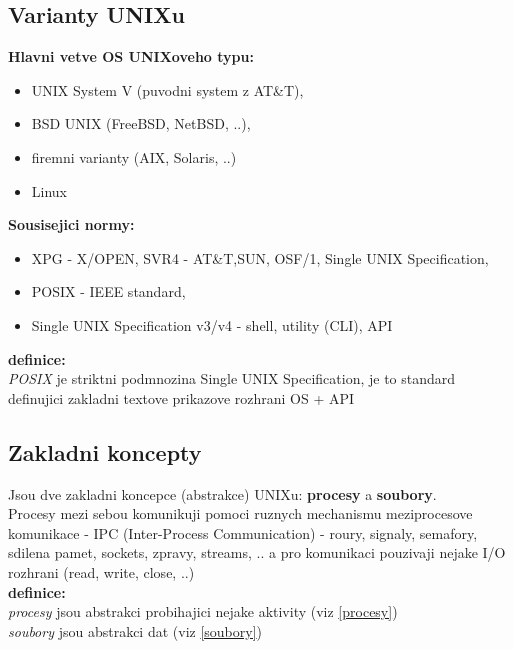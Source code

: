\documentclass[a4paper, 11pt]{article}
\begin{document}
\newpage

\subsection{Varianty UNIXu}
\textbf{Hlavni vetve OS UNIXoveho typu:}
\begin{itemize}
    \item UNIX System V (puvodni system z AT\&T),
    \item BSD UNIX (FreeBSD, NetBSD, ..),
    \item firemni varianty (AIX, Solaris, ..)
    \item Linux \\
\end{itemize}

\noindent\textbf{Sousisejici normy:}
\begin{itemize}
    \item XPG - X/OPEN, SVR4 - AT\&T,SUN, OSF/1, Single UNIX Specification,
    \item POSIX - IEEE standard,
    \item Single UNIX Specification v3/v4 - shell, utility (CLI), API \\
\end{itemize}

\noindent\textbf{definice:} \\[0.5em]
\textit{POSIX} je striktni podmnozina Single UNIX Specification, je to standard definujici zakladni textove prikazove rozhrani OS + API \\[1em]

\subsection{Zakladni koncepty}
Jsou dve zakladni koncepce (abstrakce) UNIXu: \textbf{procesy} a \textbf{soubory}. \\

\noindent Procesy mezi sebou komunikuji pomoci ruznych mechanismu meziprocesove komunikace - IPC (Inter-Process Communication) - roury, signaly, semafory, sdilena pamet, sockets, zpravy, streams, .. a pro komunikaci pouzivaji nejake I/O rozhrani (read, write, close, ..) \\

\noindent\textbf{definice:} \\[0.5em]
\textit{procesy} jsou abstrakci probihajici nejake aktivity (viz \ref{procesy})\\[0.2em]
\textit{soubory} jsou abstrakci dat (viz \ref{soubory}) \\[1em]
\end{document}
